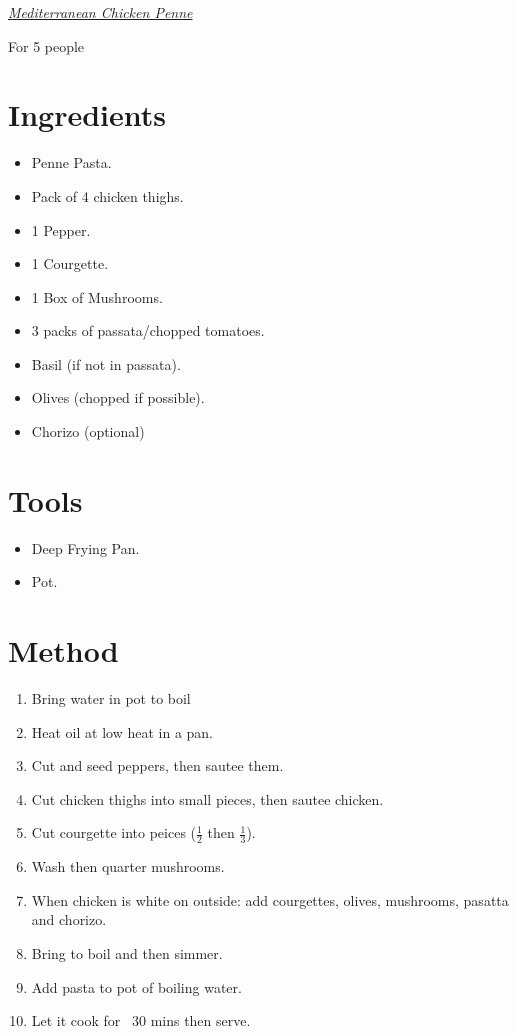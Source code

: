 \documentclass[a4paper,11pt, onecolumn]{article}
\begin{document}
   \centerline{\underline{\emph{\huge Mediterranean Chicken Penne}}}
   \centerline{\large{For 5 people}}
   \vspace{1cm}

\begin{multicols}{2}



\section*{Ingredients}

\begin{itemize}
\item Penne Pasta.
\item Pack of 4 chicken thighs.
\item 1 Pepper.
\item 1 Courgette.
\item 1 Box of Mushrooms.
\item 3 packs of passata/chopped tomatoes.
\item Basil (if not in passata).
\item Olives (chopped if possible).
\item Chorizo (optional)
\end{itemize}

\columnbreak

\section*{Tools}
\begin{itemize}
\item Deep Frying Pan.
\item Pot.
\end{itemize}

\end{multicols}
\hrulefill
\section*{Method}

\begin{enumerate}
\item Bring water in pot to boil
\item Heat oil at low heat in a pan.
\item Cut and seed peppers, then sautee them.
\item Cut chicken thighs into small pieces, then sautee chicken.
\item Cut courgette into peices ($\frac{1}{2}$ then $\frac{1}{3}$).
\item Wash then quarter mushrooms.
\item When chicken is white on outside: add courgettes, olives, mushrooms, pasatta and chorizo.
\item Bring to boil and then simmer.
\item Add pasta to pot of boiling water.
\item Let it cook for ~30 mins then serve.
\end{enumerate}
 
\end{document}
